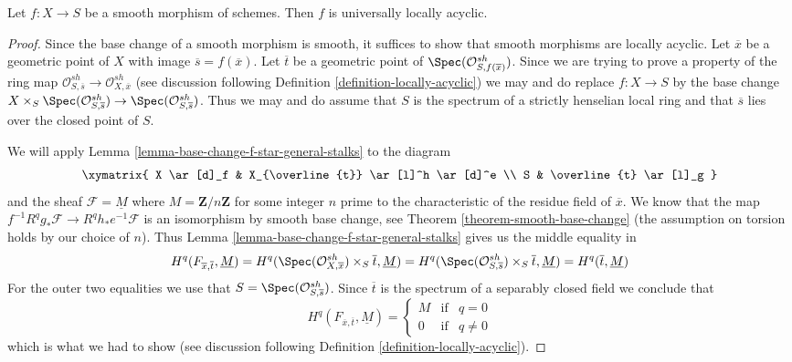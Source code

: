 \begin{proposition}
\label{proposition-smooth-locally-acyclic}
Let $f : X \to S$ be a smooth morphism of schemes.
Then $f$ is universally locally acyclic.
\end{proposition}

\begin{proof}
Since the base change of a smooth morphism is smooth, it suffices
to show that smooth morphisms are locally acyclic.
Let $\overline{x}$ be a geometric point of $X$ with image
$\overline{s} = f(\overline{x})$. Let
$\overline{t}$ be a geometric point of
$\Spec(\mathcal{O}^{sh}_{S, f(\overline{x})})$.
Since we are trying to prove a property of the ring map
$\mathcal{O}^{sh}_{S, \overline{s}} \to \mathcal{O}^{sh}_{X, \overline{x}}$
(see discussion following Definition \ref{definition-locally-acyclic})
we may and do replace $f : X \to S$ by the base change
$X \times_S \Spec(\mathcal{O}^{sh}_{S, \overline{s}}) \to
\Spec(\mathcal{O}^{sh}_{S, \overline{s}})$.
Thus we may and do assume that $S$ is the spectrum of a strictly
henselian local ring and that $\overline{s}$ lies over
the closed point of $S$.

\medskip\noindent
We will apply Lemma \ref{lemma-base-change-f-star-general-stalks}
to the diagram
$$
\xymatrix{
X \ar[d]_f & X_{\overline{t}} \ar[l]^h \ar[d]^e \\
S & \overline{t} \ar[l]_g
}
$$
and the sheaf $\mathcal{F} = \underline{M}$ where $M = \mathbf{Z}/n\mathbf{Z}$
for some integer $n$ prime to the characteristic of the residue field of
$\overline{x}$. We know that the map
$f^{-1}R^qg_*\mathcal{F} \to R^qh_*e^{-1}\mathcal{F}$
is an isomorphism by smooth base change, see
Theorem \ref{theorem-smooth-base-change} (the assumption
on torsion holds by our choice of $n$).
Thus Lemma \ref{lemma-base-change-f-star-general-stalks}
gives us the middle equality in
$$
H^q(F_{\overline{x}, \overline{t}}, \underline{M}) =
H^q(\Spec(\mathcal{O}^{sh}_{X, \overline{x}}) \times_S \overline{t},
\underline{M})
=
H^q(\Spec(\mathcal{O}^{sh}_{S, \overline{s}}) \times_S \overline{t},
\underline{M}) =
H^q(\overline{t}, \underline{M})
$$
For the outer two equalities we use that
$S = \Spec(\mathcal{O}^{sh}_{S, \overline{s}})$.
Since $\overline{t}$ is the spectrum of a separably
closed field we conclude that
$$
H^q(F_{\overline{x}, \overline{t}}, \underline{M}) =
\left\{
\begin{matrix}
M & \text{if} & q = 0 \\
0 & \text{if} & q \not = 0
\end{matrix}
\right.
$$
which is what we had to show (see discussion following
Definition \ref{definition-locally-acyclic}).
\end{proof}

